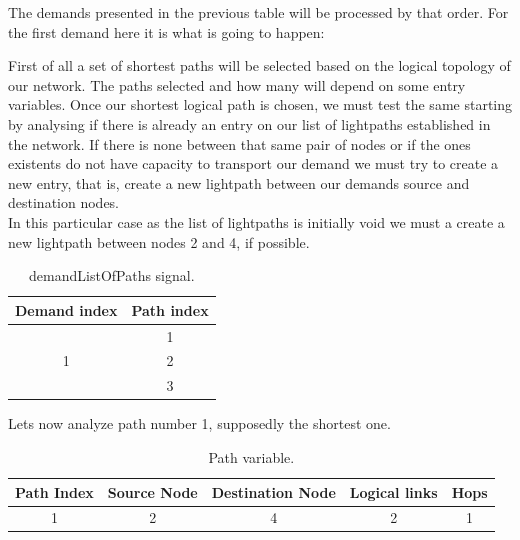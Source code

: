 The demands presented in the previous table will be processed by that order.
For the first demand here it is what is going to happen:

First of all a set of shortest paths will be selected based on the logical topology of our network. The paths selected and how many will depend on some entry variables.
Once our shortest logical path is chosen, we must test the same starting by analysing if there is already an entry on our list of lightpaths established in the network. If there is none between that same pair of nodes or if the ones existents do not have capacity to transport our demand we must try to create a new entry, that is, create a new lightpath between our demands source and destination nodes. \\
In this particular case as the list of lightpaths is initially void we must a create a new lightpath between nodes 2 and 4, if possible.  

\begin{table}[H]
	\centering
	\begin{tabular}{|c|c|l|l|}
		\hline
		Demand index           & \multicolumn{3}{c|}{Path index} \\ \hline
		\multirow{3}{*}{1} & \multicolumn{3}{c|}{1}          \\ \cline{2-4} 
		& \multicolumn{3}{c|}{2}        \\ \cline{2-4} 
		& \multicolumn{3}{c|}{3}        \\ \hline
	\end{tabular}
	\caption{demandListOfPaths signal.}
	\label{demandListOfPaths_example}
\end{table}

Lets now analyze path number 1, supposedly the shortest one.\\

\begin{table}[H]
	\centering
	\begin{tabular}{|c|c|c|c|c|}
		\hline
		Path Index & Source Node & Destination Node & Logical links & Hops\\ \hline
		1      & 2       & 4  & 2  & 1       \\ \hline
	\end{tabular}
	\caption{Path variable.}
	\label{path_variable}
\end{table}

